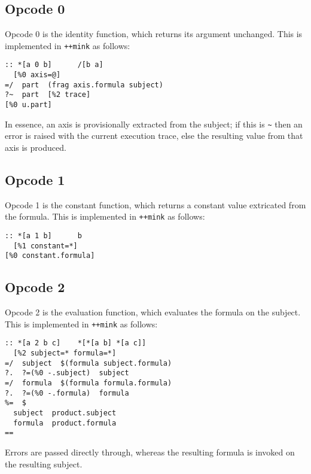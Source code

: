 \documentclass[twoside]{article}
\begin{document}
\subsection{Opcode 0}

Opcode 0 is the identity function, which returns its argument unchanged.  This is implemented in \lstinline[style=inlinecode]{++mink} as follows:

\begin{lstlisting}[style=listingcode]
:: *[a 0 b]      /[b a]
  [%0 axis=@]
=/  part  (frag axis.formula subject)
?~  part  [%2 trace]
[%0 u.part]
\end{lstlisting}

\noindent
In essence, an axis is provisionally extracted from the subject; if this is \texttt{\textasciitilde} then an error is raised with the current execution trace, else the resulting value from that axis is produced.

\subsection{Opcode 1}

\sloppy
Opcode 1 is the constant function, which returns a constant value extricated from the formula.  This is implemented in \lstinline[style=inlinecode]{++mink} as follows:

\begin{lstlisting}[style=listingcode]
:: *[a 1 b]      b
  [%1 constant=*]
[%0 constant.formula]
\end{lstlisting}

\subsection{Opcode 2}

Opcode 2 is the evaluation function, which evaluates the formula on the subject.  This is implemented in \lstinline[style=inlinecode]{++mink} as follows:

\begin{lstlisting}[style=listingcode]
:: *[a 2 b c]    *[*[a b] *[a c]]
  [%2 subject=* formula=*]
=/  subject  $(formula subject.formula)
?.  ?=(%0 -.subject)  subject
=/  formula  $(formula formula.formula)
?.  ?=(%0 -.formula)  formula
%=  $
  subject  product.subject
  formula  product.formula
==
\end{lstlisting}

\noindent
Errors are passed directly through, whereas the resulting formula is invoked on the resulting subject.
\end{document}
